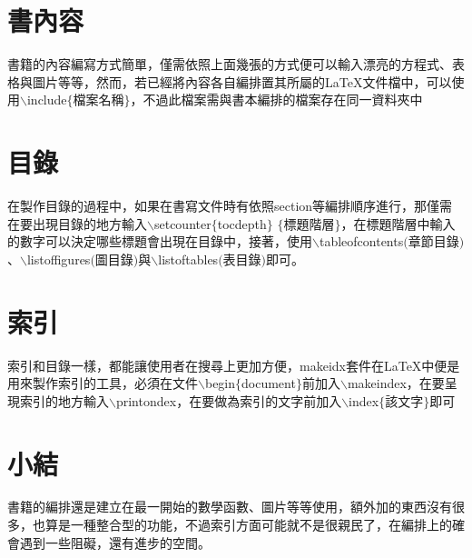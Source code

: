 \section{書內容}
書籍的內容編寫方式簡單，僅需依照上面幾張的方式便可以輸入漂亮的方程式、表格與圖片等等，然而，若已經將內容各自編排置其所屬的\LaTeX 文件檔中，可以使用$\backslash$include$\{$檔案名稱$\}$，不過此檔案需與書本編排的檔案存在同一資料夾中

\section{目錄}
在製作目錄的過程中，如果在書寫文件時有依照section等編排順序進行，那僅需在要出現目錄的地方輸入$\backslash$setcounter$\{$tocdepth$\}$ $\{$標題階層$\}$，在標題階層中輸入的數字可以決定哪些標題會出現在目錄中，接著，使用$\backslash$tableofcontents$($章節目錄$)$、$\backslash$listoffigures$($圖目錄$)$與$\backslash$listoftables$($表目錄$)$即可。

\section{索引}
索引和目錄一樣，都能讓使用者在搜尋上更加方便，{\A makeidx}套件在\LaTeX 中便是用來製作索引的工具，必須在文件$\backslash$begin$\{$document$\}$前加入$\backslash$makeindex，在要呈現索引的地方輸入$\backslash$printondex，在要做為索引的文字前加入$\backslash$index$\{$該文字$\}$即可

\section*{小結}
書籍的編排還是建立在最一開始的數學函數、圖片等等使用，額外加的東西沒有很多，也算是一種整合型的功能，不過索引方面可能就不是很親民了，在編排上的確會遇到一些阻礙，還有進步的空間。
%
